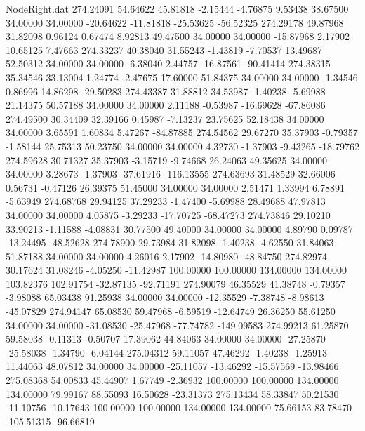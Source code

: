 \begin{filecontents}{NodeRight.dat}
 274.24091   54.64622   45.81818    -2.15444   -4.76875    9.53438   38.67500   34.00000   34.00000  -20.64622  -11.81818  -25.53625  -56.52325
 274.29178   49.87968   31.82098     0.96124    0.67474    8.92813   49.47500   34.00000   34.00000  -15.87968    2.17902   10.65125    7.47663
 274.33237   40.38040   31.55243    -1.43819   -7.70537   13.49687   52.50312   34.00000   34.00000   -6.38040    2.44757  -16.87561  -90.41414
 274.38315   35.34546   33.13004     1.24774   -2.47675   17.60000   51.84375   34.00000   34.00000   -1.34546    0.86996   14.86298  -29.50283
 274.43387   31.88812   34.53987    -1.40238   -5.69988   21.14375   50.57188   34.00000   34.00000    2.11188   -0.53987  -16.69628  -67.86086
 274.49500   30.34409   32.39166     0.45987   -7.13237   23.75625   52.18438   34.00000   34.00000    3.65591    1.60834    5.47267  -84.87885
 274.54562   29.67270   35.37903    -0.79357   -1.58144   25.75313   50.23750   34.00000   34.00000    4.32730   -1.37903   -9.43265  -18.79762
 274.59628   30.71327   35.37903    -3.15719   -9.74668   26.24063   49.35625   34.00000   34.00000    3.28673   -1.37903  -37.61916 -116.13555
 274.63693   31.48529   32.66006     0.56731   -0.47126   26.39375   51.45000   34.00000   34.00000    2.51471    1.33994    6.78891   -5.63949
 274.68768   29.94125   37.29233    -1.47400   -5.69988   28.49688   47.97813   34.00000   34.00000    4.05875   -3.29233  -17.70725  -68.47273
 274.73846   29.10210   33.90213    -1.11588   -4.08831   30.77500   49.40000   34.00000   34.00000    4.89790    0.09787  -13.24495  -48.52628
 274.78900   29.73984   31.82098    -1.40238   -4.62550   31.84063   51.87188   34.00000   34.00000    4.26016    2.17902  -14.80980  -48.84750
 274.82974   30.17624   31.08246    -4.05250  -11.42987  100.00000  100.00000  134.00000  134.00000  103.82376  102.91754  -32.87135  -92.71191
 274.90079   46.35529   41.38748    -0.79357   -3.98088   65.03438   91.25938   34.00000   34.00000  -12.35529   -7.38748   -8.98613  -45.07829
 274.94147   65.08530   59.47968    -6.59519  -12.64749   26.36250   55.61250   34.00000   34.00000  -31.08530  -25.47968  -77.74782 -149.09583
 274.99213   61.25870   59.58038    -0.11313   -0.50707   17.39062   44.84063   34.00000   34.00000  -27.25870  -25.58038   -1.34790   -6.04144
 275.04312   59.11057   47.46292    -1.40238   -1.25913   11.44063   48.07812   34.00000   34.00000  -25.11057  -13.46292  -15.57569  -13.98466
 275.08368   54.00833   45.44907     1.67749   -2.36932  100.00000  100.00000  134.00000  134.00000   79.99167   88.55093   16.50628  -23.31373
 275.13434   58.33847   50.21530   -11.10756  -10.17643  100.00000  100.00000  134.00000  134.00000   75.66153   83.78470 -105.51315  -96.66819

\end{filecontents}
